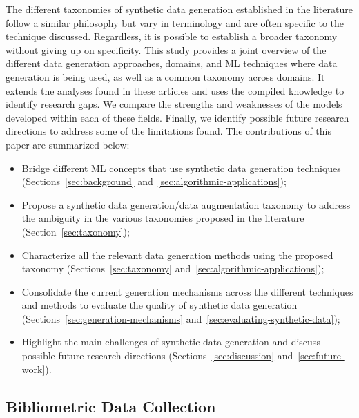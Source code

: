 The different taxonomies of synthetic data generation established in the
literature follow a similar philosophy but vary in terminology and are
often specific to the technique discussed. Regardless, it is possible to
establish a broader taxonomy without giving up on specificity. This study
provides a joint overview of the different data generation approaches,
domains, and ML techniques where data generation is being used, as well
as a common taxonomy across domains. It extends the analyses found in these
articles and uses the compiled knowledge to identify research gaps. We compare
the strengths and weaknesses of the models developed within each of these
fields. Finally, we identify possible future research directions to address
some of the limitations found. The contributions of this paper are summarized
below:

\begin{itemize}

    \item Bridge different ML concepts that use synthetic data generation
        techniques (Sections~\ref{sec:background}
        and~\ref{sec:algorithmic-applications});

    \item Propose a synthetic data generation/data augmentation taxonomy to
        address the ambiguity in the various taxonomies proposed in the
        literature (Section~\ref{sec:taxonomy});

    \item Characterize all the relevant data generation methods using the
        proposed taxonomy (Sections~\ref{sec:taxonomy}
        and~\ref{sec:algorithmic-applications});

    \item Consolidate the current generation mechanisms across the
        different techniques and methods to evaluate the quality of
        synthetic data generation (Sections~\ref{sec:generation-mechanisms}
        and~\ref{sec:evaluating-synthetic-data});

    \item Highlight the main challenges of synthetic data generation and
        discuss possible future research directions
        (Sections~\ref{sec:discussion} and~\ref{sec:future-work}).

\end{itemize}

\subsection{Bibliometric Data Collection}

